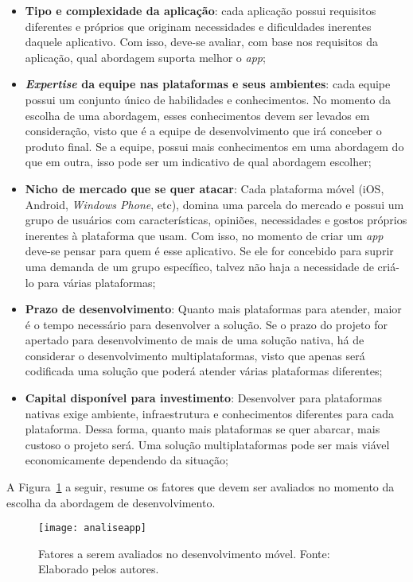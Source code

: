 \begin{itemize}
    \item \textbf{Tipo e complexidade da aplicação}: cada aplicação possui requisitos diferentes e próprios que originam necessidades e dificuldades inerentes daquele aplicativo. Com isso, deve-se avaliar,
    com base nos requisitos da aplicação, qual abordagem suporta melhor o \textit{app};
    \item \textbf{\textit{Expertise} da equipe nas plataformas e seus ambientes}: cada equipe possui um conjunto único de habilidades e conhecimentos. No momento da escolha de uma abordagem, esses conhecimentos
    devem ser levados em consideração, visto que é a equipe de desenvolvimento que irá conceber o produto final. Se a equipe, possui mais conhecimentos em uma abordagem do que em outra, isso pode ser 
    um indicativo de qual abordagem escolher;
    \item \textbf{Nicho de mercado que se quer atacar}: Cada plataforma móvel (iOS, Android, \textit{Windows Phone}, etc), domina uma parcela do mercado e possui um grupo de usuários com 
    características, opiniões, necessidades e gostos próprios inerentes à plataforma que usam. Com isso, no momento de criar um \textit{app} deve-se pensar para quem é esse aplicativo. Se ele for concebido 
    para suprir uma demanda de um grupo específico, talvez não haja a necessidade de criá-lo para várias plataformas;
    \item \textbf{Prazo de desenvolvimento}: Quanto mais plataformas para atender, maior é o tempo necessário para desenvolver a solução. Se o prazo do projeto for apertado para desenvolvimento de mais de uma solução 
    nativa, há de considerar o desenvolvimento multiplataformas, visto que apenas será codificada uma solução que poderá atender várias plataformas diferentes;
    \item \textbf{Capital disponível para investimento}: Desenvolver para plataformas nativas exige ambiente, infraestrutura e conhecimentos diferentes para cada plataforma. Dessa forma, quanto mais plataformas se 
    quer abarcar, mais custoso o projeto será. Uma solução multiplataformas pode ser mais viável economicamente dependendo da situação;
\end{itemize}

A Figura~\ref{fig:analiseapp} a seguir, resume os fatores que devem ser avaliados no momento da escolha da abordagem de desenvolvimento.
\begin{figure}[H]
  \centering
    \texttt{[image: analiseapp]}
    \caption[Fatores a serem avaliados no desenvolvimento móvel]{ Fatores a serem avaliados no desenvolvimento móvel. Fonte: Elaborado pelos autores.}
	\label{fig:analiseapp}
\end{figure}

